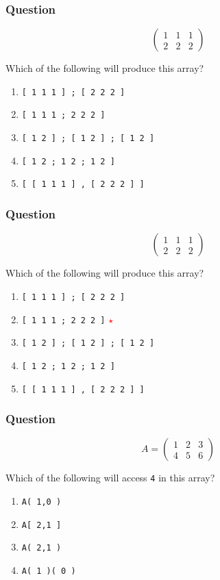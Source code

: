 \documentclass[11pt]{beamer}
\newcommand{\correctstar}{{\Large\textcolor{red}{$\star$}}}
\begin{document}
\begin{frame}[fragile]
  \frametitle{Question}
  \Enlarge
$$
\left(
\begin{array}{ccc}
1 & 1 & 1 \\
2 & 2 & 2
\end{array}
\right)
$$

Which of the following will produce this array?

  \begin{enumerate}[label=\Alph*]
    \item  \texttt{[ 1 1 1 ] ; [ 2 2 2 ]}
    \item  \texttt{[ 1 1 1 ; 2 2 2 ]}
    \item  \texttt{[ 1 2 ] ; [ 1 2 ] ; [ 1 2 ]}
    \item  \texttt{[ 1 2 ; 1 2 ; 1 2 ]}
    \item  \texttt{[ [ 1 1 1 ] , [ 2 2 2 ] ]}
  \end{enumerate}
\end{frame}

\begin{frame}[fragile]
  \frametitle{Question}
  \Enlarge
$$
\left(
\begin{array}{ccc}
1 & 1 & 1 \\
2 & 2 & 2
\end{array}
\right)
$$

Which of the following will produce this array?

  \begin{enumerate}[label=\Alph*]
    \item  \texttt{[ 1 1 1 ] ; [ 2 2 2 ]}
    \item  \texttt{[ 1 1 1 ; 2 2 2 ]} \correctstar
    \item  \texttt{[ 1 2 ] ; [ 1 2 ] ; [ 1 2 ]}
    \item  \texttt{[ 1 2 ; 1 2 ; 1 2 ]}
    \item  \texttt{[ [ 1 1 1 ] , [ 2 2 2 ] ]}
  \end{enumerate}
\end{frame}

\begin{frame}[fragile]
  \frametitle{Question}
  \Enlarge
$$
A =
\left(
\begin{array}{ccc}
1 & 2 & 3 \\
4 & 5 & 6
\end{array}
\right)
$$

Which of the following will access \texttt{4} in this array?

  \begin{enumerate}[label=\Alph*]
    \item  \texttt{A( 1,0 )}
    \item  \texttt{A[ 2,1 ]}
    \item  \texttt{A( 2,1 )}
    \item  \texttt{A( 1 )( 0 )}
  \end{enumerate}
\end{frame}
\end{document}
